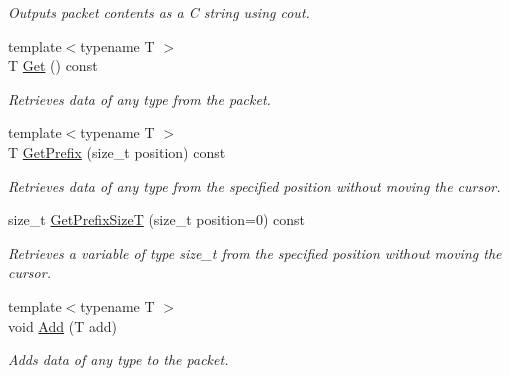 \begin{DoxyCompactItemize}
\begin{DoxyCompactList}\small\item\em Outputs packet contents as a C string using cout. \item\end{DoxyCompactList}\item 
{\footnotesize template$<$typename T $>$ }\\T \hyperlink{class_packet_a80e211740ec18468ac623e2a333234e0}{Get} () const 
\begin{DoxyCompactList}\small\item\em Retrieves data of any type from the packet. \item\end{DoxyCompactList}\item 
{\footnotesize template$<$typename T $>$ }\\T \hyperlink{class_packet_ac42cb39221c733bfbf2c405ecf436250}{GetPrefix} (size\_\-t position) const 
\begin{DoxyCompactList}\small\item\em Retrieves data of any type from the specified position without moving the cursor. \item\end{DoxyCompactList}\item 
size\_\-t \hyperlink{class_packet_aeb3920d9196357139ad67a3b24054697}{GetPrefixSizeT} (size\_\-t position=0) const 
\begin{DoxyCompactList}\small\item\em Retrieves a variable of type size\_\-t from the specified position without moving the cursor. \item\end{DoxyCompactList}\item 
{\footnotesize template$<$typename T $>$ }\\void \hyperlink{class_packet_ae9adff3647758cc7f8eb4c7d132e7ba4}{Add} (T add)
\begin{DoxyCompactList}\small\item\em Adds data of any type to the packet. \item\end{DoxyCompactList}\end{DoxyCompactItemize}
